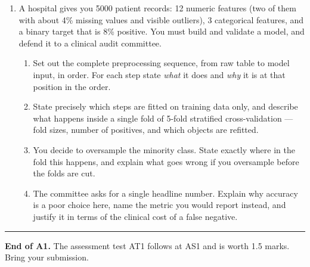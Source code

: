 \documentclass[11pt,a4paper]{article}
\begin{document}
\begin{enumerate}[label=\textbf{\arabic*.}, leftmargin=*, start=10]
  \item A hospital gives you 5000 patient records: 12 numeric features (two of
    them with about 4\% missing values and visible outliers), 3 categorical
    features, and a binary target that is 8\% positive. You must build and
    validate a model, and defend it to a clinical audit committee.
    \begin{enumerate}[label=(\alph*), leftmargin=*]
      \item Set out the complete preprocessing sequence, from raw table to
        model input, in order. For each step state \emph{what} it does and
        \emph{why} it is at that position in the order. 
      \item State precisely which steps are fitted on training data only, and
        describe what happens inside a single fold of 5-fold stratified
        cross-validation --- fold sizes, number of positives, and which objects
        are refitted. 
      \item You decide to oversample the minority class. State exactly where in
        the fold this happens, and explain what goes wrong if you oversample
        before the folds are cut. 
      \item The committee asks for a single headline number. Explain why
        accuracy is a poor choice here, name the metric you would report
        instead, and justify it in terms of the clinical cost of a false
        negative. 
    \end{enumerate}
\end{enumerate}

\vspace{0.8em}\hrule\vspace{0.6em}
\noindent\small\textbf{End of A1.} The assessment test AT1 follows at AS1 and
is worth 1.5 marks. Bring your submission.\normalsize
\end{document}

